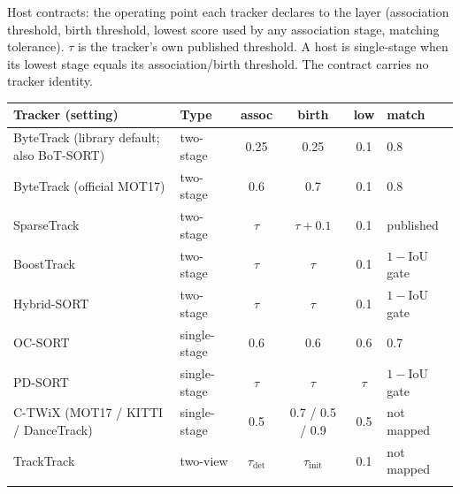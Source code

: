 \begin{tableorg}[!htbp]
\centering
\caption{Host contracts: the operating point each tracker declares to the layer (association threshold, birth threshold, lowest score used by any association stage, matching tolerance). $\tau$ is the tracker's own published threshold. A host is single-stage when its lowest stage equals its association/birth threshold. The contract carries no tracker identity.}
\label{tab:contracts}
\footnotesize
\setlength\tabcolsep{3.5pt}
\begin{adjustbox}{max width=\linewidth}
\begin{tabular}{p{5.0cm}lcccl}
\toprule
Tracker (setting) & Type & assoc & birth & low & match \\
\midrule
ByteTrack (library default; also BoT-SORT) & two-stage & 0.25 & 0.25 & 0.1 & 0.8 \\
ByteTrack (official MOT17) & two-stage & 0.6 & 0.7 & 0.1 & 0.8 \\
SparseTrack & two-stage & $\tau$ & $\tau+0.1$ & 0.1 & published \\
BoostTrack & two-stage & $\tau$ & $\tau$ & 0.1 & $1-$IoU gate \\
Hybrid-SORT & two-stage & $\tau$ & $\tau$ & 0.1 & $1-$IoU gate \\
OC-SORT & single-stage & 0.6 & 0.6 & 0.6 & 0.7 \\
PD-SORT & single-stage & $\tau$ & $\tau$ & $\tau$ & $1-$IoU gate \\
C-TWiX (MOT17 / KITTI / DanceTrack) & single-stage & 0.5 & 0.7 / 0.5 / 0.9 & 0.5 & not mapped \\
TrackTrack & two-view & $\tau_{\mathrm{det}}$ & $\tau_{\mathrm{init}}$ & 0.1 & not mapped \\
\botrule
\end{tabular}
\end{adjustbox}
\end{tableorg}
